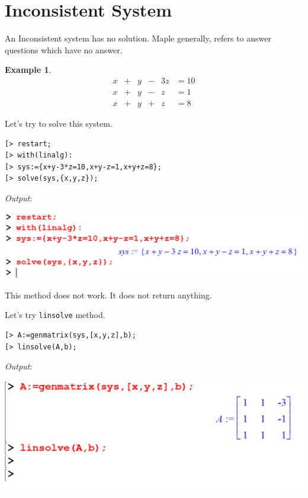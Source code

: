 \documentclass[
]{book}
\theoremstyle{definition}
\theoremstyle{definition}
\newtheorem{example}{Example}[chapter]
\theoremstyle{definition}
\theoremstyle{definition}
\theoremstyle{remark}
\begin{document}
\section{Inconsistent System}\label{inconsistent-system}

An Inconsistent system has no solution. Maple generally, refers to answer questions which have no answer.

\begin{example}
\protect\hypertarget{exm:unnamed-chunk-20}{}\label{exm:unnamed-chunk-20}\[
\begin{array}{ccccccccc}
x &+& y &-& 3z &= 10\\
x &+& y &-&  z &= 1\\
x &+& y &+&  z &= 8  
\end{array}
\]
\end{example}

Let's try to solve this system.

\begin{verbatim}
[> restart;
[> with(linalg):
[> sys:={x+y-3*z=10,x+y-z=1,x+y+z=8};
[> solve(sys,{x,y,z});
\end{verbatim}

\emph{Output}:

\includegraphics{figures/Lesson 5/fig11.png}

This method does not work. It does not return anything.

Let's try \texttt{linsolve} method.

\begin{verbatim}
[> A:=genmatrix(sys,[x,y,z],b);
[> linsolve(A,b);
\end{verbatim}

\emph{Output}:

\includegraphics{figures/Lesson 5/fig12.png}
\end{document}
